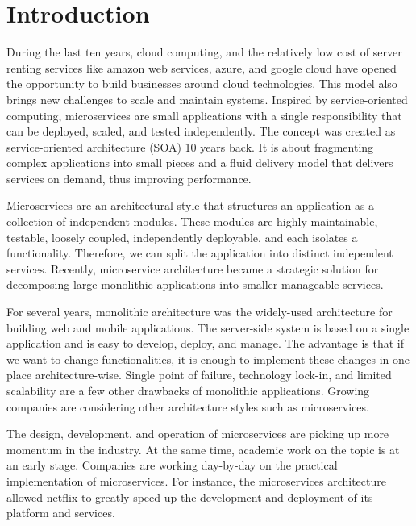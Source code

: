
\section{Introduction}

During the last ten years, cloud computing, and the relatively low cost of server renting services like amazon web services, azure, and google cloud have opened the opportunity to build businesses around cloud technologies. This model also brings new challenges to scale and maintain systems.\cite{Claus2016} Inspired by service-oriented computing, microservices are small applications with a single responsibility that can be deployed, scaled, and tested independently. The concept was created as service-oriented architecture (SOA) 10 years back. It is about fragmenting complex applications into small pieces and a fluid delivery model that delivers services on demand, thus improving performance.\cite{Larrucea2018}

Microservices are an architectural style that structures an application as a collection of independent modules. These modules are highly maintainable, testable, loosely coupled, independently deployable, and each isolates a functionality. Therefore, we can split the application into distinct independent services.\cite{thones2015} Recently, microservice architecture became a strategic solution for decomposing large monolithic applications into smaller manageable services.\cite{Taibi2019} 

For several years, monolithic architecture was the widely-used architecture for building web and mobile applications. The server-side system is based on a single application and is easy to develop, deploy, and manage.\cite{Danbettinger2019} The advantage is that if we want to change functionalities, it is enough to implement these changes in one place architecture-wise.\cite{Pavlovic2020} Single point of failure, technology lock-in, and limited scalability are a few other drawbacks of monolithic applications. Growing companies are considering other architecture styles such as microservices.\cite{Lenga2019, Jag2017, Rodrigue2016}

The design, development, and operation of microservices are picking up more momentum in the industry. At the same time, academic work on the topic is at an early stage.\cite{Soldani2018, Dragoni2017, Olaf2016} 
Companies are working day-by-day on the practical implementation of microservices.\cite{Kevin2015, Alpers2015} For instance, the microservices architecture allowed netflix\cite{Meshenberg2016} to greatly speed up the development and deployment of its platform and services.

